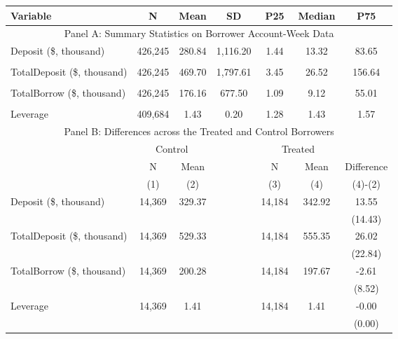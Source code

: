 \begin{table}[ht!]
\begin{tabular*}{\linewidth}{@{\extracolsep{\fill}}lcccccc }
    \toprule
     Variable  &N & Mean & SD & P25 & Median & P75 \\
     \midrule
    \multicolumn{7}{c}{Panel A: Summary Statistics on Borrower Account-Week Data} \\
    \midrule
    Deposit (\$, thousand) & 426,245 & 280.84 & 1,116.20 & 1.44  & 13.32 & 83.65 \\
          &       &       &       &       &       &  \\
    TotalDeposit (\$, thousand) & 426,245 & 469.70 & 1,797.61 & 3.45  & 26.52 & 156.64 \\
          &       &       &       &       &       &  \\
    TotalBorrow (\$, thousand) & 426,245 & 176.16 & 677.50 & 1.09  & 9.12  & 55.01 \\
          &       &       &       &       &       &  \\
    Leverage & 409,684 & 1.43  & 0.20  & 1.28  & 1.43  & 1.57 \\
    \midrule
        \multicolumn{7}{c}{Panel B: Differences across the Treated and Control Borrowers} \\
\midrule
          & \multicolumn{2}{c}{Control} &       & \multicolumn{2}{c}{Treated} &  \\
\cmidrule{2-3}\cmidrule{5-6}          & N & Mean &       & N & Mean & Difference \\
\cmidrule{2-3}\cmidrule{5-6}          & (1) & (2) &       & (3) & (4) & (4)-(2) \\
\cmidrule{2-7}    Deposit (\$, thousand) & 14,369 & 329.37 &       & 14,184 & 342.92 & 13.55 \\
          &       &       &       &       &       & (14.43) \\
    TotalDeposit (\$, thousand) & 14,369 & 529.33 &       & 14,184 & 555.35 & 26.02 \\
          &       &       &       &       &       & (22.84) \\
    TotalBorrow (\$, thousand) & 14,369 & 200.28 &       & 14,184 & 197.67 & -2.61 \\
          &       &       &       &       &       & (8.52) \\
    Leverage & 14,369 & 1.41  &       & 14,184 & 1.41  & -0.00 \\
          &       &       &       &       &       & (0.00) \\
    \bottomrule
          \end{tabular*} 



\end{table}%




